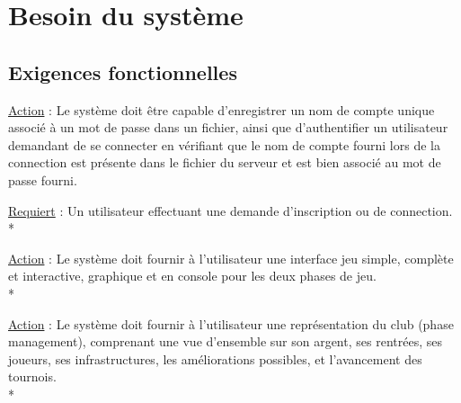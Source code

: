 \documentclass[a4paper]{article}
\begin{document}
\section{Besoin du système}
	\subsection{Exigences fonctionnelles}
		\begin{description}[style=nextline]
			\item[Vérification d'authentification :]
			\begin{description}[leftmargin=*] %
				\item[]
				\item \underline{Action} : Le système doit être capable d'enregistrer un nom de compte unique associé à un mot de passe dans un fichier, ainsi que d'authentifier un utilisateur demandant de se connecter en vérifiant que le nom de compte fourni lors de la connection est présente dans le fichier du serveur et est bien associé au mot de passe fourni.
				\item \underline{Requiert} : Un utilisateur effectuant une demande d'inscription ou de connection.\\*
			\end{description} %
			
			\item[Interface :]
			\begin{description}[leftmargin=*] %
				\item[]
				\item \underline{Action} : Le système doit fournir à l'utilisateur une interface jeu simple, complète et interactive, graphique et en console pour les deux phases de jeu.\\*
			\end{description} %
			
			\item[Représentation phase management :]
			\begin{description}[leftmargin=*] %
				\item[]
				\item \underline{Action} : Le système doit fournir à l'utilisateur une représentation du \gls{club} (phase management), comprenant une vue d'ensemble sur son argent, ses rentrées, ses joueurs, ses infrastructures, les améliorations possibles, et l'avancement des tournois.\\*
			\end{description} %
			

\end{description}
\end{document}
